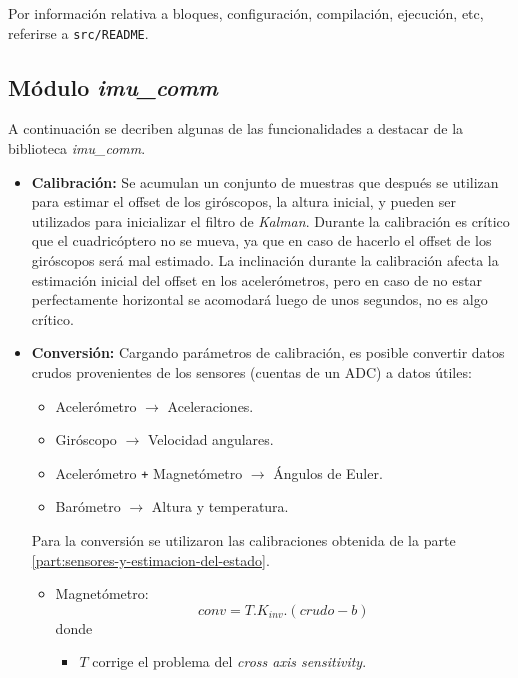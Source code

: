 \documentclass[main]{subfiles}
\begin{document}
Por información relativa a bloques, configuración, compilación, ejecución, etc, referirse a \verb+src/README+.

\subsection{M\'odulo \textit{imu\_comm}}
\label{sec:software:imu-comm}

A continuaci\'on se decriben algunas de las funcionalidades a destacar de la biblioteca \textit{imu\_comm}.

\begin{itemize}
\item \textbf{Calibración:} Se acumulan un conjunto de muestras que después se utilizan para estimar el offset de los giróscopos, la altura inicial, y pueden ser utilizados para inicializar el filtro de \textit{Kalman}. Durante la calibraci\'on es cr\'itico que el cuadric\'optero no se mueva, ya que en caso de hacerlo el offset de los gir\'oscopos ser\'a mal estimado.\newline
La inclinaci\'on durante la calibraci\'on afecta la estimaci\'on inicial del offset en los aceler\'ometros, pero en caso de no estar perfectamente horizontal se acomodar\'a luego de unos segundos, no es algo cr\'itico.
\item \textbf{Conversión:} Cargando parámetros de calibración, es posible convertir datos crudos provenientes de los sensores (cuentas de un ADC) a datos útiles:
  \begin{itemize}
  \item Aceler\'ometro $\rightarrow$ Aceleraciones.
  \item Gir\'oscopo $\rightarrow$ Velocidad angulares.
  \item Aceler\'ometro \verb~+~ Magnet\'ometro  $\rightarrow$ \'Angulos de Euler.
  \item Bar\'ometro $\rightarrow$ Altura y temperatura.
  \end{itemize}
Para la conversi\'on se utilizaron las calibraciones obtenida de la parte \ref{part:sensores-y-estimacion-del-estado}.
\begin{itemize}
\item Magnet\'ometro:
  \begin{equation}
    \label{eq:software:calib-lineal}
    conv = T.K_{inv}.(crudo - b)
  \end{equation}
  donde
  \begin{itemize}
  \item $T$ corrige el problema del \textit{cross axis sensitivity}.

\end{itemize}
\end{itemize}
\end{itemize}
\end{document}
